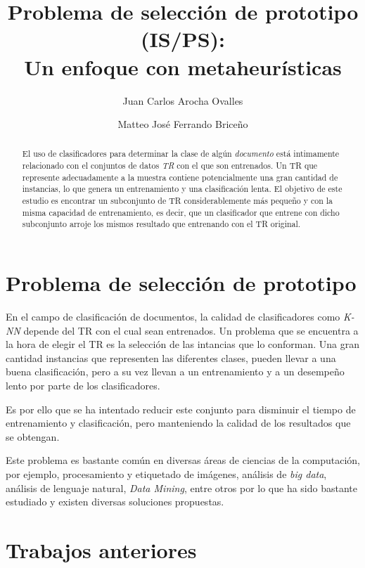 \documentclass{ci5652}
\title{Problema de selección de prototipo (IS/PS):\\
       Un enfoque con metaheurísticas}
\author{Juan Carlos Arocha Ovalles
        \and
        Matteo José Ferrando Briceño}
\begin{document}
\thispagestyle{empty}
\maketitle


\begin{abstract}
El uso de clasificadores para determinar la clase de algún \textit{documento} está intimamente relacionado con el conjuntos de datos \textit{TR} con el que son entrenados. Un TR que represente adecuadamente a la muestra contiene potencialmente una gran cantidad de instancias, lo que genera un entrenamiento y una clasificación lenta. El objetivo de este estudio es encontrar un subconjunto de TR considerablemente más pequeño y con la misma capacidad de entrenamiento, es decir, que un clasificador que entrene con dicho subconjunto arroje los mismos resultado que entrenando con el TR original.


\end{abstract}

\section{Problema de selección de prototipo}

En el campo de clasificación de documentos, la calidad de clasificadores como \textit{K-NN} depende del TR con el cual sean entrenados. Un problema que se encuentra a la hora de elegir el TR es la selección de las intancias que lo conforman. Una gran cantidad instancias que representen las diferentes clases, pueden llevar a una buena clasificación, pero a su vez llevan a un entrenamiento y a un desempeño lento por parte de los clasificadores.

Es por ello que se ha intentado reducir este conjunto para disminuir el tiempo de entrenamiento y clasificación, pero manteniendo la calidad de los resultados que se obtengan.

Este problema es bastante común en diversas áreas de ciencias de la computación, por ejemplo, procesamiento y etiquetado de imágenes, análisis de \textit{big data}, análisis de lenguaje natural, \textit{Data Mining}, entre otros por lo que ha sido bastante estudiado y existen diversas soluciones propuestas.

\section{Trabajos anteriores}
\label{sect:works}
\end{document}
